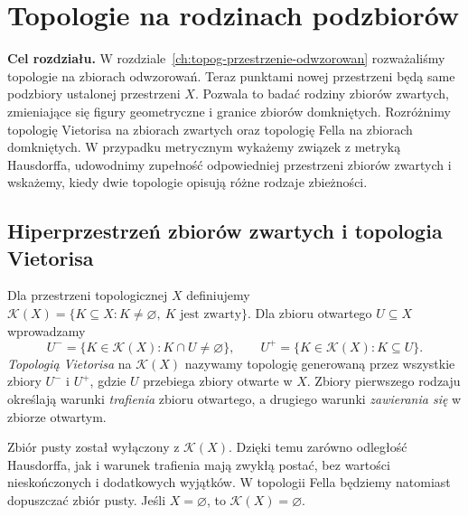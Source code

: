 \chapter{Topologie na rodzinach podzbiorów}
\label{ch:topog-hiperprzestrzenie}

\noindent\textbf{Cel rozdziału.}
W rozdziale~\ref{ch:topog-przestrzenie-odwzorowan} rozważaliśmy
topologie na zbiorach odwzorowań. Teraz punktami nowej przestrzeni
będą same podzbiory ustalonej przestrzeni \(X\).
Pozwala to badać rodziny zbiorów zwartych, zmieniające się
figury geometryczne i granice zbiorów domkniętych.
Rozróżnimy topologię Vietorisa na zbiorach zwartych
oraz topologię Fella na zbiorach domkniętych.
W przypadku metrycznym wykażemy związek z metryką Hausdorffa,
udowodnimy zupełność odpowiedniej przestrzeni zbiorów zwartych
i wskażemy, kiedy dwie topologie opisują różne rodzaje zbieżności.

\section{Hiperprzestrzeń zbiorów zwartych i topologia Vietorisa}
\label{sec:topog21-vietoris}

\begin{definicja}
\label{def:topog21-kx}
Dla przestrzeni topologicznej \(X\) definiujemy
\(\mathcal K(X)=\{K\subseteq X:K\neq\varnothing,\ K
\text{ jest zwarty}\}\).
Dla zbioru otwartego \(U\subseteq X\) wprowadzamy
\[
 U^-=\{K\in\mathcal K(X):K\cap U\neq\varnothing\},
 \qquad
 U^+=\{K\in\mathcal K(X):K\subseteq U\}.
\]
\emph{Topologią Vietorisa} na \(\mathcal K(X)\)
nazywamy topologię generowaną przez wszystkie zbiory
\(U^-\) i \(U^+\), gdzie \(U\) przebiega zbiory otwarte w \(X\).
Zbiory pierwszego rodzaju określają warunki
\emph{trafienia} zbioru otwartego, a drugiego
warunki \emph{zawierania się} w zbiorze otwartym.
\end{definicja}

\begin{uwaga}
\label{rem:topog21-empty}
Zbiór pusty został wyłączony z \(\mathcal K(X)\).
Dzięki temu zarówno odległość Hausdorffa,
jak i warunek trafienia mają zwykłą postać,
bez wartości nieskończonych i dodatkowych wyjątków.
W topologii Fella będziemy natomiast dopuszczać zbiór pusty.
Jeśli \(X=\varnothing\), to \(\mathcal K(X)=\varnothing\).
\end{uwaga}

